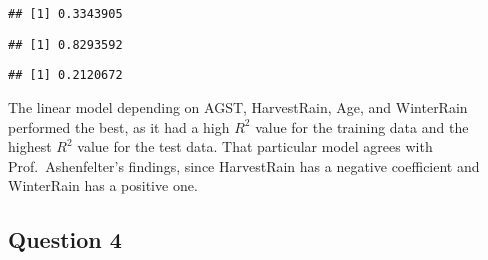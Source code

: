 \documentclass[
]{article}
\newenvironment{Shaded}{\begin{snugshade}}{\end{snugshade}}
\newcommand{\CommentTok}[1]{\textcolor[rgb]{0.56,0.35,0.01}{\textit{#1}}}
\newcommand{\DecValTok}[1]{\textcolor[rgb]{0.00,0.00,0.81}{#1}}
\newcommand{\FunctionTok}[1]{\textcolor[rgb]{0.00,0.00,0.00}{#1}}
\newcommand{\NormalTok}[1]{#1}
\newcommand{\OtherTok}[1]{\textcolor[rgb]{0.56,0.35,0.01}{#1}}
\newcommand{\SpecialCharTok}[1]{\textcolor[rgb]{0.00,0.00,0.00}{#1}}
\begin{document}
\begin{verbatim}
## [1] 0.3343905
\end{verbatim}

\begin{Shaded}
\end{Shaded}

\begin{verbatim}
## [1] 0.8293592
\end{verbatim}

\begin{Shaded}
\end{Shaded}

\begin{verbatim}
## [1] 0.2120672
\end{verbatim}

The linear model depending on AGST, HarvestRain, Age, and WinterRain
performed the best, as it had a high \(R^2\) value for the training data
and the highest \(R^2\) value for the test data. That particular model
agrees with Prof.~Ashenfelter's findings, since HarvestRain has a
negative coefficient and WinterRain has a positive one.

\hypertarget{question-4}{%
\subsection{Question 4}\label{question-4}}
\end{document}
